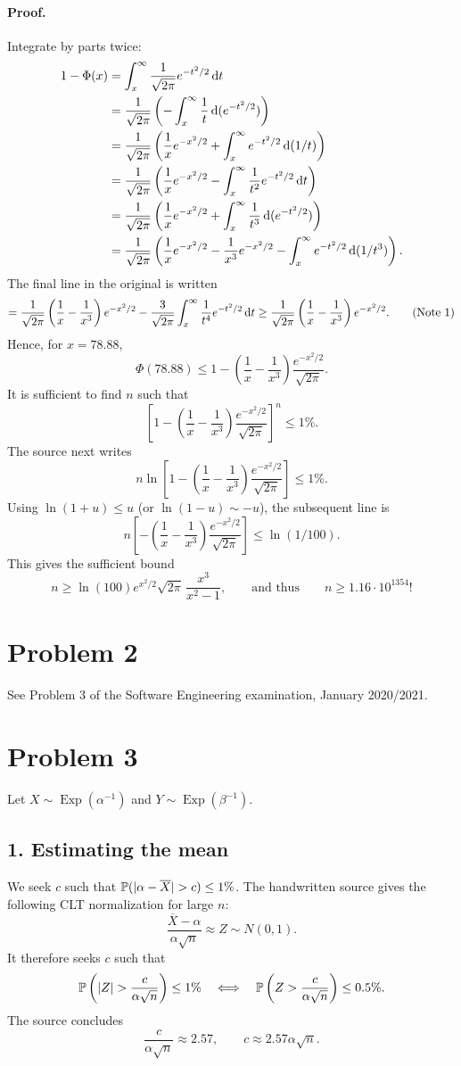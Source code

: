 \documentclass[11pt,a4paper]{article}
\begin{document}
\paragraph{Proof.} Integrate by parts twice:
\begin{align*}
1-\Phi(x)&=\int_x^\infty\frac1{\sqrt{2\pi}}e^{-t^2/2}\, \mathrm{d} t\\
&=\frac1{\sqrt{2\pi}}\left(-\int_x^\infty\frac1t\, \mathrm{d}(e^{-t^2/2})\right)\\
&=\frac1{\sqrt{2\pi}}\left(\frac1x e^{-x^2/2}
+\int_x^\infty e^{-t^2/2}\, \mathrm{d}(1/t)\right)\\
&=\frac1{\sqrt{2\pi}}\left(\frac1x e^{-x^2/2}
-\int_x^\infty\frac1{t^2}e^{-t^2/2}\, \mathrm{d} t\right)\\
&=\frac1{\sqrt{2\pi}}\left(\frac1x e^{-x^2/2}
+\int_x^\infty\frac1{t^3}\, \mathrm{d}(e^{-t^2/2})\right)\\
&=\frac1{\sqrt{2\pi}}\left(\frac1x e^{-x^2/2}-\frac1{x^3}e^{-x^2/2}
-\int_x^\infty e^{-t^2/2}\, \mathrm{d}(1/t^3)\right).
\end{align*}
The final line in the original is written
\[
=\frac1{\sqrt{2\pi}}\left(\frac1x-\frac1{x^3}\right)e^{-x^2/2}
-\frac3{\sqrt{2\pi}}\int_x^\infty\frac1{t^4}e^{-t^2/2}\, \mathrm{d} t
\ge\frac1{\sqrt{2\pi}}\left(\frac1x-\frac1{x^3}\right)e^{-x^2/2}.\tag{Note 1}
\]
Hence, for $x=78.88$,
\[
\Phi(78.88)\le1-\left(\frac1x-\frac1{x^3}\right)
\frac{e^{-x^2/2}}{\sqrt{2\pi}}.
\]
It is sufficient to find $n$ such that
\[
\left[1-\left(\frac1x-\frac1{x^3}\right)
\frac{e^{-x^2/2}}{\sqrt{2\pi}}\right]^n\le1\%.
\]
The source next writes
\[
n\ln\left[1-\left(\frac1x-\frac1{x^3}\right)
\frac{e^{-x^2/2}}{\sqrt{2\pi}}\right]\le1\%.\tag{Note 2}
\]
Using $\ln(1+u)\le u$ (or $\ln(1-u)\sim-u$), the subsequent line is
\[
n\left[-\left(\frac1x-\frac1{x^3}\right)
\frac{e^{-x^2/2}}{\sqrt{2\pi}}\right]\le\ln(1/100).
\]
This gives the sufficient bound
\[
n\ge\ln(100)e^{x^2/2}\sqrt{2\pi}\,\frac{x^3}{x^2-1},
\qquad\text{and thus}\qquad n\ge1.16\cdot10^{1354}!
\]

\section*{Problem 2}
See Problem 3 of the Software Engineering examination, January 2020/2021.

\section*{Problem 3}
Let $X\sim\operatorname{Exp}(\alpha^{-1})$ and $Y\sim\operatorname{Exp}(\beta^{-1})$.
\subsection*{1. Estimating the mean}
We seek $c$ such that $\P(|\alpha-\overline X|>c)\le1\%$.
The handwritten source gives the following CLT normalization for large $n$:
\[
\frac{\overline X-\alpha}{\alpha\sqrt n}\approx Z\sim N(0,1).\tag{Note 3}
\]
It therefore seeks $c$ such that
\[
\P\left(|Z|>\frac c{\alpha\sqrt n}\right)\le1\%
\quad\Longleftrightarrow\quad
\P\left(Z>\frac c{\alpha\sqrt n}\right)\le0.5\%.
\]
The source concludes
\[
\frac c{\alpha\sqrt n}\approx2.57,
\qquad c\approx2.57\alpha\sqrt n.\tag{Note 3}
\]
\end{document}
